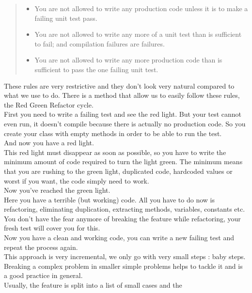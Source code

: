 \begin{quote}
\begin{itemize}
\item You are not allowed to write any production code unless it is to
make a failing unit test pass.
\item You are not allowed to write any more of a unit test than is
sufficient to fail;
and compilation failures are failures.
\item You are not allowed to write any more production code than is
sufficient
to pass the one failing unit test.
\end{itemize}
\end{quote}

These rules are very restrictive and they don't look very natural
compared to what we use to do.
There is a method that allow us to easily follow these rules, the
Red Green Refactor cycle. \\
\newline
First you need to write a failing test and see the red light.
But your test cannot even run, it doesn't compile because there is
actually no production code.
So you create your class with empty methods in order to be able to run
the test. \\
And now you have a red light. \\
\newline
This red light must disappear as soon as possible, so you have to write
the minimum amount of code required to turn the light green.
The minimum means that you are rushing to the green light, duplicated
code, hardcoded values or worst if you want, the code simply need to
work. \\
Now you've reached the green light. \\
\newline
Here you have a terrible (but working) code.
All you have to do now is refactoring, eliminating duplication,
extracting methods, variables, constants etc.
You don't have the fear anymore of breaking the feature while
refactoring, your fresh test will cover you for this. \\
Now you have a clean and working code, you can write a new failing test
and repeat the process again. \\
\newline
This approach is very incremental, we only go with very small steps :
baby steps.
Breaking a complex problem in smaller simple problems helps to tackle it
and is a good practice in general. \\
Usually, the feature is split into a list of small cases and the
